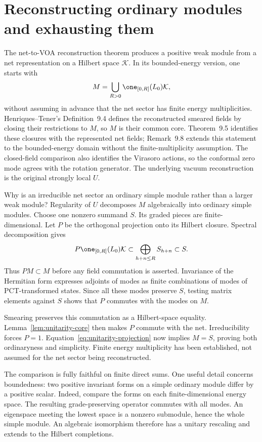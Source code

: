 \section{Reconstructing ordinary modules and exhausting them}

The net-to-VOA reconstruction theorem produces a positive weak
module from a net representation on a Hilbert space $\mathcal K$.
In its bounded-energy version,
one starts with
\[
 M=\bigcup_{R>0}\one_{[0,R]}(L_0)\mathcal K,
\]
without assuming in advance that the net sector has finite energy
multiplicities. Henriques--Tener's Definition~9.4 defines the
reconstructed smeared fields by closing their restrictions to $M$,
so $M$ is their common core. Theorem~9.5 identifies these closures
with the represented net fields; Remark~9.8 extends this statement
to the bounded-energy domain without the finite-multiplicity
assumption. The closed-field comparison also identifies the
Virasoro actions, so the conformal zero mode agrees
with the rotation generator. The underlying vacuum reconstruction
is the original strongly local $U$.

Why is an irreducible net sector an ordinary simple module rather
than a larger weak module? Regularity of $U$ decomposes $M$
algebraically into ordinary simple modules. Choose one nonzero
summand $S$. Its graded pieces are finite-dimensional. Let $P$ be
the orthogonal projection onto its Hilbert closure. Spectral
decomposition gives
\begin{equation}
 P\one_{[0,R]}(L_0)\mathcal K
 \subset\bigoplus_{h+n\le R}S_{h+n}\subset S.
 \label{eq:unitarity-projection}
\end{equation}
Thus $PM\subset M$ before any field commutation is asserted.
Invariance of the Hermitian form expresses adjoints of modes as
finite combinations of modes of PCT-transformed states. Since all
these modes preserve $S$, testing matrix elements against $S$
shows that $P$ commutes with the modes on $M$.

Smearing preserves this commutation as a Hilbert-space equality.
Lemma~\ref{lem:unitarity-core} then makes $P$ commute with the net.
Irreducibility forces $P=1$. Equation~\eqref{eq:unitarity-projection}
now implies $M=S$, proving both ordinaryness and simplicity. Finite
energy multiplicity has been established, not assumed for the net
sector being reconstructed.

The comparison is fully faithful on finite direct sums. One useful
detail concerns boundedness: two positive invariant forms on a
simple ordinary module differ by a positive scalar. Indeed, compare
the forms on each finite-dimensional energy space. The resulting
grade-preserving operator commutes with all modes. An eigenspace
meeting the lowest space is a nonzero submodule, hence the whole
simple module. An algebraic isomorphism therefore has a unitary
rescaling and extends to the Hilbert completions.

